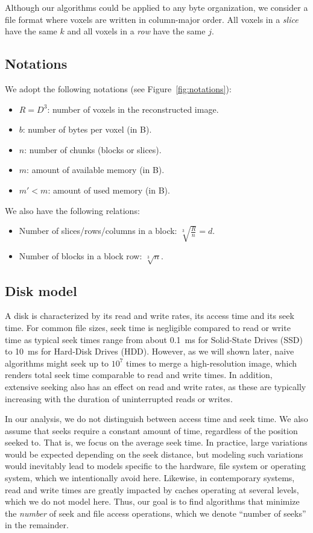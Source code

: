\documentclass[10pt, conference, compsocconf]{IEEEtran}
\begin{document}
Although our algorithms could be applied to any byte organization, we
consider a file format where voxels are written in column-major
order. All voxels in a \emph{slice} have the same $k$ and all voxels
in a \emph{row} have the same $j$.  

\subsection{Notations}

We adopt the following notations (see Figure~\ref{fig:notations}):
\begin{itemize}
\item $R=D^3$: number of voxels in the reconstructed image.
\item $b$: number of bytes per voxel (in B).
\item $n$: number of chunks (blocks or slices).
\item $m$: amount of available memory (in B).
\item $m'<m$: amount of used memory (in B).
\end{itemize}
We also have the following relations:
\begin{itemize}
\item Number of slices/rows/columns in a block: $\sqrt[3]{\frac{R}{n}}=d$.
\item Number of blocks in a block row: $\sqrt[3]{n}$.
\end{itemize}

\subsection{Disk model}

A disk is characterized by its read and write rates, its access time
and its seek time. For common file sizes, seek time is negligible
compared to read or write time as typical seek times range from about
0.1~ms for Solid-State Drives (SSD) to 10~ms for Hard-Disk Drives
(HDD). However, as we will shown later, naive algorithms might seek up
to $10^7$ times to merge a high-resolution image, which renders total
seek time comparable to read and write times. In addition, extensive
seeking also has an effect on read and write rates, as these are
typically increasing with the duration of uninterrupted reads or
writes.

In our analysis, we do not distinguish between access time
and seek time.  We also assume that seeks require a constant amount of
time, regardless of the position seeked to. That is, we focus on the
average seek time. In practice, large variations would be expected
depending on the seek distance, but modeling such variations would
inevitably lead to models specific to the hardware, file system or
operating system, which we intentionally avoid here. Likewise, in
contemporary systems, read and write times are greatly impacted by caches
operating at several levels, which we do not model here. Thus, our
goal is to find algorithms that minimize the \emph{number} of seek and
file access operations, which we denote ``number of seeks'' in the
remainder.
\end{document}
